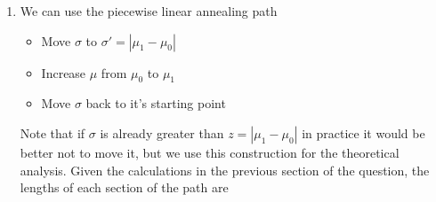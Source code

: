 \documentclass{article}
\begin{document}
\begin{enumerate}
\begin{align}
        &= 
        \frac 1 2(x-\mu)^2\left(\frac {1-\beta}{\sigma_0^2} + \frac {\beta}{\sigma_1^2} \right)
    \end{align}
    In essence we are linearly varying the precision.
    We derive the Fisher information for $\sigma^2$ fixing $\mu$ and using that
    $\E X = \mu$
    \begin{align}
        \frac{\partial \ell}{\partial \sigma^2} &=
            -\frac 1 {2\sigma^2} + \frac 1 2 \frac{(x-\mu)^2}{\sigma^4} \\
        \frac{\partial \ell^2}{{\partial \sigma^2}^2} &=
            \frac{1}{2\sigma^4} - \frac{(x-\mu)^2}{\sigma^6} \\
        I(\sigma^2) &=
            \frac{1}{2\sigma^4}
    \end{align}
    Taking the one-dimensional integral again we find
    \begin{align}
        \int_{\sigma_0^2}^{\sigma_1^2} \sqrt{I(\sigma^2)} \d \sigma^2 
            &= \int_{\sigma_0^2}^{\sigma_1^2} \frac{1}{\sqrt{2}\sigma^2} \d \sigma^2 \\
            &= \frac{1}{\sqrt{2}}\left[\log \sigma_1^2 - \log \sigma_0^2 \right] \\
            &= \sqrt{2} \left[ \log \sigma_1 - \log \sigma_0 \right]
    \end{align}
    Taking the sign into account for the path integral we get the Fisher-Rao
    length of the path is
    \begin{align}
        \Lambda &= \left| \sqrt{2} \left[ \log \sigma_1 - \log \sigma_0 \right] \right| \\
            &= \sqrt{2} \left| \log \frac{\sigma_0}{\sigma_1} \right| 
    \end{align}
    \item %
    We can use the piecewise linear annealing path
    \begin{itemize}
        \item Move $\sigma$ to $\sigma' = |\mu_1 - \mu_0|$
        \item Increase $\mu$ from $\mu_0$ to $\mu_1$
        \item Move $\sigma$ back to it's starting point
    \end{itemize}
    Note that if $\sigma$ is already greater than $z = |\mu_1 - \mu_0|$ in 
    practice it would be better not to move it, but we use this construction for
    the theoretical analysis.
    Given the calculations in the previous section of the question, the lengths
    of each section of the path are

\end{enumerate}
\end{document}
